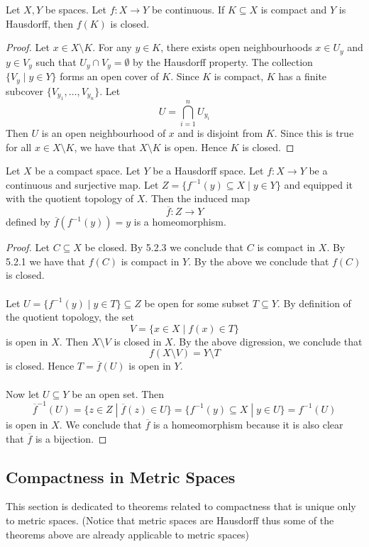 \documentclass[a4paper]{article}
\begin{document}
\begin{prp}{}{} Let $X,Y$ be spaces. Let $f:X\to Y$ be continuous. If $K\subseteq X$ is compact and $Y$ is Hausdorff, then $f(K)$ is closed. \tcbline
\begin{proof}
Let $x\in X\setminus K$. For any $y\in K$, there exists open neighbourhoods $x\in U_y$ and $y\in V_y$ such that $U_y\cap V_y=\emptyset$ by the Hausdorff property. The collection $\{V_y\;|\;y\in Y\}$ forms an open cover of $K$. Since $K$ is compact, $K$ has a finite subcover $\{V_{y_1},\dots,V_{y_n}\}$. Let $$U=\bigcap_{i=1}^nU_{y_i}$$ Then $U$ is an open neighbourhood of $x$ and is disjoint from $K$. Since this is true for all $x\in X\setminus K$, we have that $X\setminus K$ is open. Hence $K$ is closed. 
\end{proof}
\end{prp}

\begin{prp}{}{} Let $X$ be a compact space. Let $Y$ be a Hausdorff space. Let $f:X\to Y$ be a continuous and surjective map. Let $Z=\{f^{-1}(y)\subseteq X\;|\;y\in Y\}$ and equipped it with the quotient topology of $X$. Then the induced map $$\overline{f}:Z\to Y$$ defined by $\overline{f}(f^{-1}(y))=y$ is a homeomorphism. \tcbline
\begin{proof}
Let $C\subseteq X$ be closed. By 5.2.3 we conclude that $C$ is compact in $X$. By 5.2.1 we have that $f(C)$ is compact in $Y$. By the above we conclude that $f(C)$ is closed. \\~\\

Let $U=\{f^{-1}(y)\;|\; y\in T\}\subseteq Z$ be open for some subset $T\subseteq Y$. By definition of the quotient topology, the set $$V=\{x\in X\;|\;f(x)\in T\}$$ is open in $X$. Then $X\setminus V$ is closed in $X$. By the above digression, we conclude that $$f(X\setminus V)=Y\setminus T$$ is closed. Hence $T=\overline{f}(U)$ is open in $Y$. \\~\\

Now let $U\subseteq Y$ be an open set. Then $$\overline{f}^{-1}(U)=\{z\in Z\;|\;\overline{f}(z)\in U\}=\{f^{-1}(y)\subseteq X\;|\;y\in U\}=f^{-1}(U)$$ is open in $X$. We conclude that $\overline{f}$ is a homeomorphism because it is also clear that $\overline{f}$ is a bijection. 
\end{proof}
\end{prp}

\subsection{Compactness in Metric Spaces}
This section is dedicated to theorems related to compactness that is unique only to metric spaces. (Notice that metric spaces are Hausdorff thus some of the theorems above are already applicable to metric spaces)
\end{document}
